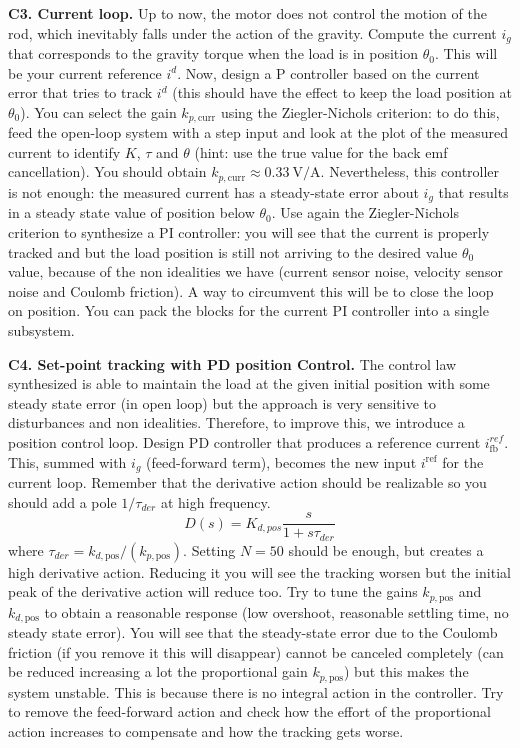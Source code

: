 \documentclass[11pt]{article}
\begin{document}
\par
\textbf{C3. Current loop.} 
Up to now, the motor does not control the motion of the rod, 
which inevitably falls under the action of the gravity. Compute the current $i_g$ that corresponds to the 
gravity torque when the load is in position $\theta_0$. This will be your current reference $i^d$.
Now, design a P controller based on the current error that tries to track $i^d$ 
(this should have the effect to keep the load position at $\theta_0$). 
You can select the gain $k_{p, \mathrm{curr}}$ using the Ziegler-Nichols criterion: to do this, 
feed the open-loop system with a step input and look at the plot of the 
measured current to identify $K$, $\tau$ and $\theta$  
(hint: use the true value for the back emf cancellation). You should obtain $k_{p, \mathrm{curr}} \approx 0.33 \ \mathrm{V/A}$. 
Nevertheless, this controller is not enough: the measured current has a steady-state error about $i_g$ that results in a steady state value of position below  $\theta_0$.
Use again the Ziegler-Nichols criterion to synthesize a PI controller: 
you will see that the current is properly tracked and but the load position is still  not arriving to the desired value $\theta_0$ value, because of the non idealities we have (current sensor noise, velocity sensor noise and Coulomb friction). 
A way to circumvent this will be to close the loop on position. 
You can pack the blocks for the current PI controller into a single subsystem.

\par
\textbf{C4. Set-point tracking with PD position Control. } 
The control law synthesized is able to maintain the 
load at the given initial position with some steady state error (in open loop) 
but the approach is very sensitive to disturbances and non idealities. 
Therefore, to improve this, we introduce a position  control loop.
Design  PD controller that produces a reference current $i^{ref}_{\mathrm{fb}}$. 
This, summed with $i_g$ (feed-forward term), becomes the new input $i^\mathrm{ref}$ for the current loop.
Remember that the derivative action should be realizable so you should add a pole $1/\tau_{der}$ at high frequency.
\begin{equation}
D(s)  = K_{d,pos} \frac{s}{1 + s \tau_{der}}
\end{equation}
where  $\tau_{der} = k_{d,\mathrm{pos}}/(k_{p, \mathrm{pos}})$. Setting $N = 50$ should be enough, 
but creates a high derivative action. Reducing it you will 
see the tracking worsen but the initial peak of the derivative action will reduce too.
Try to tune the gains $k_{p, \mathrm{pos}}$ and $k_{d, \mathrm{pos}}$  to obtain a reasonable response (low overshoot, reasonable settling time, no steady state error).
You will see that the steady-state error due to the 
Coulomb friction (if you remove it this will disappear) cannot be canceled completely (can be reduced increasing a lot the proportional 
gain $k_{p, \mathrm{pos}}$) but this makes the system unstable.
This is because there is no integral action in the controller. 
Try to remove the feed-forward action and check how the effort of the proportional action increases to compensate 
and how the tracking gets worse. 
\end{document}
